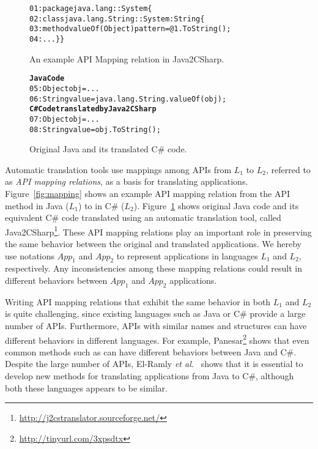\begin{figure}[t]
\begin{CodeOut}%
\begin{alltt}
01: package java.lang::System\{
02:   class java.lang.String :: System:String\{
03:   method valueOf(Object) { pattern = @1.ToString(); }
04:   ...\}\}
\end{alltt}
\end{CodeOut}\vspace*{-4ex}
\caption{\label{fig:mapping} An example API Mapping relation in Java2CSharp.}\vspace*{-2ex}
\begin{CodeOut}%
\begin{alltt}
\textbf{Java Code}
05:  Object obj = ...
06:  String value = java.lang.String.valueOf(obj);
\textbf{C# Code translated by Java2CSharp}
07:  Object obj = ...
08:  String value = obj.ToString();
\end{alltt}
\end{CodeOut}\vspace*{-4ex}
\caption{\label{fig:transcode}Original Java and its translated C\# code.}\vspace*{-4ex}
\end{figure}

Automatic translation tools use mappings among APIs from $L_1$ to $L_2$, referred to as \emph{API mapping relations}, as a basis for translating applications. Figure~\ref{fig:mapping} shows an example API mapping relation from the API method  in Java ($L_1$) to  in C\# ($L_2$). Figure~\ref{fig:transcode} shows original Java code and its equivalent C\# code translated using an automatic translation tool, called Java2CSharp\footnote{\url{http://j2cstranslator.sourceforge.net/}}. These API mapping relations play an important role in preserving the same behavior between the original and translated applications. We hereby use notations $App_1$ and $App_2$ to represent applications in languages $L_1$ and $L_2$, respectively. Any inconsistencies among these mapping relations could result in different behaviors between $App_1$ and $App_2$ applications.

Writing API mapping relations that exhibit the same behavior in both $L_1$ and $L_2$ is quite challenging, since existing languages such as Java or C\# provide a large number of APIs. Furthermore, APIs with similar names and structures can have different behaviors in different languages. For example, Panesar\footnote{\url{http://tinyurl.com/3xpsdtx}} shows that even common methods such as  can have different behaviors between Java and C\#. Despite the large number of APIs, El-Ramly \emph{et al.}~\cite{el2006experiment} shows that it is essential to develop new methods for translating applications from Java to C\#, although both these languages appears to be similar.

